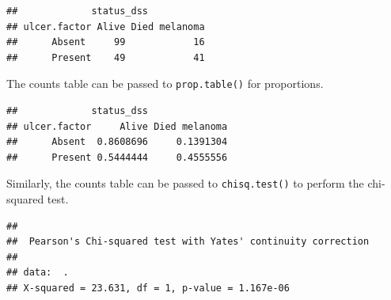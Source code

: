 \documentclass[
  12pt,
  krantz2]{krantz}
\makeatletter
\newenvironment{Shaded}{\begin{snugshade}}{\end{snugshade}}
\newcommand{\CommentTok}[1]{\textcolor[rgb]{0.56,0.35,0.01}{\textit{#1}}}
\newcommand{\DataTypeTok}[1]{\textcolor[rgb]{0.13,0.29,0.53}{#1}}
\newcommand{\DecValTok}[1]{\textcolor[rgb]{0.00,0.00,0.81}{#1}}
\newcommand{\KeywordTok}[1]{\textcolor[rgb]{0.13,0.29,0.53}{\textbf{#1}}}
\newcommand{\NormalTok}[1]{#1}
\newcommand{\OperatorTok}[1]{\textcolor[rgb]{0.81,0.36,0.00}{\textbf{#1}}}
\newcommand{\StringTok}[1]{\textcolor[rgb]{0.31,0.60,0.02}{#1}}
\newenvironment{kframe}{%
\medskip{}
\setlength{\fboxsep}{.8em}
 \def\at@end@of@kframe{}%
 \ifinner\ifhmode%
  \def\at@end@of@kframe{\end{minipage}}%
  \begin{minipage}{\columnwidth}%
 \fi\fi%
 \def\FrameCommand##1{\hskip\@totalleftmargin \hskip-\fboxsep
 \colorbox{shadecolor}{##1}\hskip-\fboxsep
     \hskip-\linewidth \hskip-\@totalleftmargin \hskip\columnwidth}%
 \MakeFramed {\advance\hsize-\width
   \@totalleftmargin\z@ \linewidth\hsize
   \@setminipage}}%
 {\par\unskip\endMakeFramed%
 \at@end@of@kframe}
\renewenvironment{Shaded}{\begin{kframe}}{\end{kframe}}
\makeatother
\begin{document}
\begin{Shaded}
\end{Shaded}

\begin{verbatim}
##             status_dss
## ulcer.factor Alive Died melanoma
##      Absent     99            16
##      Present    49            41
\end{verbatim}

The counts table can be passed to \texttt{prop.table()} for proportions.

\begin{Shaded}
\end{Shaded}

\begin{verbatim}
##             status_dss
## ulcer.factor     Alive Died melanoma
##      Absent  0.8608696     0.1391304
##      Present 0.5444444     0.4555556
\end{verbatim}

Similarly, the counts table can be passed to \texttt{chisq.test()} to perform the chi-squared test.

\begin{Shaded}
\end{Shaded}

\begin{verbatim}
## 
##  Pearson's Chi-squared test with Yates' continuity correction
## 
## data:  .
## X-squared = 23.631, df = 1, p-value = 1.167e-06
\end{verbatim}
\end{document}
